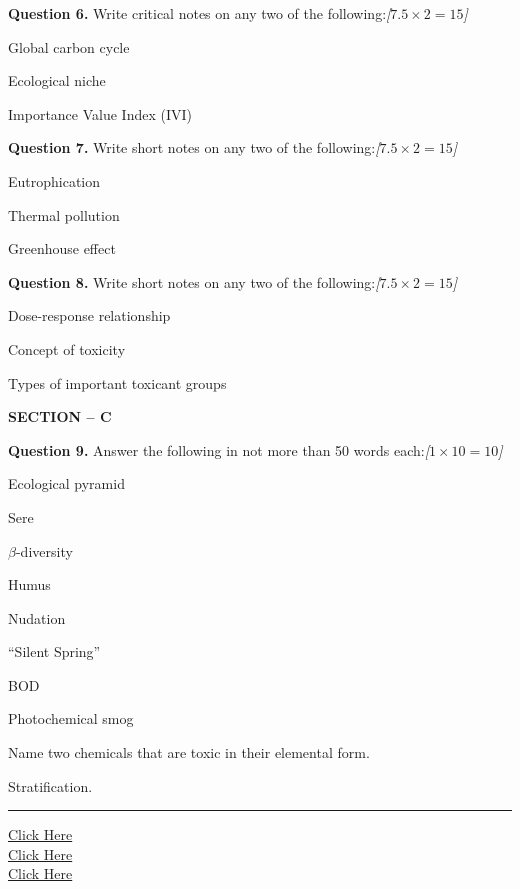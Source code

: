 \documentclass[11pt,a4paper]{article}
\newcommand{\pts}[1]{\hfill   \textit{[#1]}}
\begin{document}
\medskip


\noindent   \textbf{Question 6.} Write critical notes on any two of the following:\pts{$7.5  \times 2 = 15$}

\begin{parts}
  \item Global carbon cycle
  \item Ecological niche
  \item Importance Value Index (IVI)
\end{parts}

\medskip


\noindent   \textbf{Question 7.} Write short notes on any two of the following:\pts{$7.5  \times 2 = 15$}

\begin{parts}
  \item Eutrophication
  \item Thermal pollution
  \item Greenhouse effect
\end{parts}

\medskip


\noindent   \textbf{Question 8.} Write short notes on any two of the following:\pts{$7.5  \times 2 = 15$}

\begin{parts}
  \item Dose-response relationship
  \item Concept of toxicity
  \item Types of important toxicant groups
\end{parts}

\bigskip

\begin{center}
   \textbf{SECTION -- C}
\end{center}

\medskip


\noindent   \textbf{Question 9.} Answer the following in not more than 50 words each:\pts{$1  \times 10 = 10$}

\begin{parts}
  \item Ecological pyramid
  \item Sere
  \item $\beta$-diversity
  \item Humus
  \item Nudation
  \item ``Silent Spring''
  \item BOD
  \item Photochemical smog
  \item Name two chemicals that are toxic in their elemental form.
  \item Stratification.
\end{parts}

\vfill
\rule{\linewidth}{0.4pt}

\begin{center}\small
\href{https://bhu-exam.vercel.app/}{Click Here}\\[4pt]\href{https://me-aryan.vercel.app/}{Click Here}\\[4pt]\href{https://quashan-me.vercel.app/}{Click Here}
\end{center}
\end{document}
